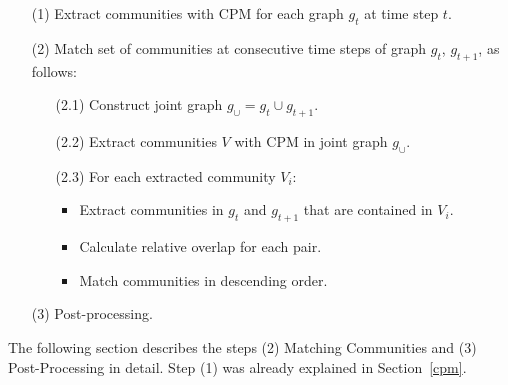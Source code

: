 \documentclass[runningheads,a4paper]{llncs}
\begin{document}
\medskip

\noindent
\colorbox{usethiscolorhere}{
\begin{minipage}{\dimexpr\textwidth-2\fboxsep}

\begin{enumerate}
\small
\item[(1)] Extract communities with CPM for each graph $g_t$ at time step $t$.
\item[(2)] Match set of communities at consecutive time steps of graph $g_t$, $g_{t+1}$, as follows:
	\begin{enumerate}
		\item[(2.1)] Construct joint graph $g_{\cup}=g_t \cup g_{t+1}$.
		\item[(2.2)] Extract communities $V$ with CPM in joint graph $g_{\cup}$.
		\item[(2.3)] For each extracted community $V_i$: 
		\begin{itemize}
			\item Extract communities in $g_t$ and $g_{t+1}$ that are contained in $V_i$.
			\item Calculate relative overlap for each pair.
			\item Match communities in descending order.
		\end{itemize}
	\end{enumerate}
\item[(3)] Post-processing.
\end{enumerate}

\end{minipage}
}

\medskip

The following section describes the steps (2) Matching Communities and (3) Post-Processing in detail.
Step (1) was already explained in Section~\ref{cpm}.
\end{document}
